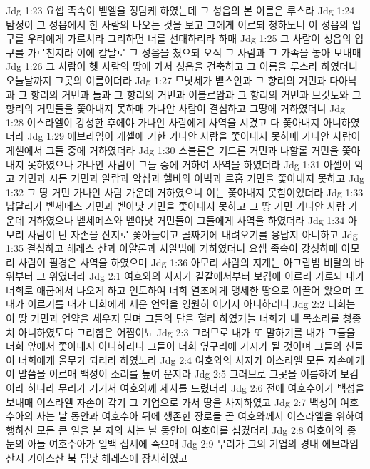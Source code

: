 Jdg 1:23  요셉 족속이 벧엘을 정탐케 하였는데 그 성읍의 본 이름은 루스라
Jdg 1:24  탐정이 그 성읍에서 한 사람의 나오는 것을 보고 그에게 이르되 청하노니 이 성읍의 입구를 우리에게 가르치라 그리하면 너를 선대하리라 하매
Jdg 1:25  그 사람이 성읍의 입구를 가르친지라 이에 칼날로 그 성읍을 쳤으되 오직 그 사람과 그 가족을 놓아 보내매
Jdg 1:26  그 사람이 헷 사람의 땅에 가서 성읍을 건축하고 그 이름을 루스라 하였더니 오늘날까지 그곳의 이름이더라
Jdg 1:27  므낫세가 벧스안과 그 향리의 거민과 다아낙과 그 향리의 거민과 돌과 그 향리의 거민과 이블르암과 그 향리의 거민과 므깃도와 그 향리의 거민들을 쫓아내지 못하매 가나안 사람이 결심하고 그땅에 거하였더니
Jdg 1:28  이스라엘이 강성한 후에야 가나안 사람에게 사역을 시켰고 다 쫓아내지 아니하였더라
Jdg 1:29  에브라임이 게셀에 거한 가나안 사람을 쫓아내지 못하매 가나안 사람이 게셀에서 그들 중에 거하였더라
Jdg 1:30  스불론은 기드론 거민과 나할롤 거민을 쫓아내지 못하였으나 가나안 사람이 그들 중에 거하여 사역을 하였더라
Jdg 1:31  아셀이 악고 거민과 시돈 거민과 알랍과 악십과 헬바와 아빅과 르홉 거민을 쫓아내지 못하고
Jdg 1:32  그 땅 거민 가나안 사람 가운데 거하였으니 이는 쫓아내지 못함이었더라
Jdg 1:33  납달리가 벧세메스 거민과 벧아낫 거민을 쫓아내지 못하고 그 땅 거민 가나안 사람 가운데 거하였으나 벧세메스와 벧아낫 거민들이 그들에게 사역을 하였더라
Jdg 1:34  아모리 사람이 단 자손을 산지로 쫓아들이고 골짜기에 내려오기를 용납지 아니하고
Jdg 1:35  결심하고 헤레스 산과 아얄론과 사알빔에 거하였더니 요셉 족속이 강성하매 아모리 사람이 필경은 사역을 하였으며
Jdg 1:36  아모리 사람의 지계는 아그랍빔 비탈의 바위부터 그 위였더라
Jdg 2:1  여호와의 사자가 길갈에서부터 보김에 이르러 가로되 내가 너희로 애굽에서 나오게 하고 인도하여 너희 열조에게 맹세한 땅으로 이끌어 왔으며 또 내가 이르기를 내가 너희에게 세운 언약을 영원히 어기지 아니하리니
Jdg 2:2  너희는 이 땅 거민과 언약을 세우지 말며 그들의 단을 헐라 하였거늘 너희가 내 목소리를 청종치 아니하였도다 그리함은 어찜이뇨
Jdg 2:3  그러므로 내가 또 말하기를 내가 그들을 너희 앞에서 쫓아내지 아니하리니 그들이 너희 옆구리에 가시가 될 것이며 그들의 신들이 너희에게 올무가 되리라 하였노라
Jdg 2:4  여호와의 사자가 이스라엘 모든 자손에게 이 말씀을 이르매 백성이 소리를 높여 운지라
Jdg 2:5  그러므로 그곳을 이름하여 보김이라 하니라 무리가 거기서 여호와께 제사를 드렸더라
Jdg 2:6  전에 여호수아가 백성을 보내매 이스라엘 자손이 각기 그 기업으로 가서 땅을 차지하였고
Jdg 2:7  백성이 여호수아의 사는 날 동안과 여호수아 뒤에 생존한 장로들 곧 여호와께서 이스라엘을 위하여 행하신 모든 큰 일을 본 자의 사는 날 동안에 여호아를 섬겼더라
Jdg 2:8  여호아의 종 눈의 아들 여호수아가 일백 십세에 죽으매
Jdg 2:9  무리가 그의 기업의 경내 에브라임 산지 가아스산 북 딤낫 헤레스에 장사하였고
